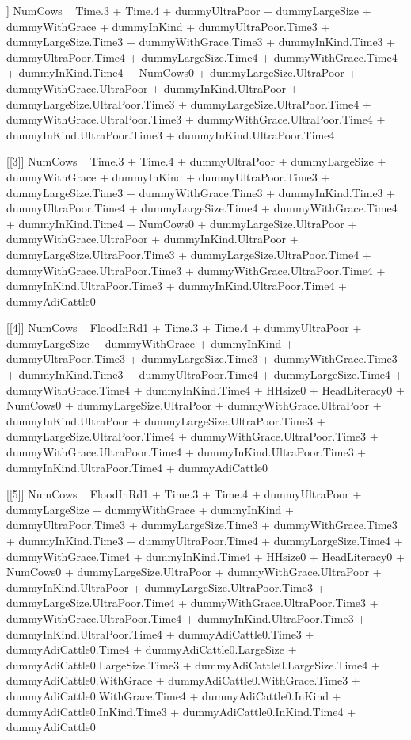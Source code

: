 \begin{Schunk}
\begin{Soutput}
[[2]]
NumCows ~ Time.3 + Time.4 + dummyUltraPoor + dummyLargeSize + 
    dummyWithGrace + dummyInKind + dummyUltraPoor.Time3 + dummyLargeSize.Time3 + 
    dummyWithGrace.Time3 + dummyInKind.Time3 + dummyUltraPoor.Time4 + 
    dummyLargeSize.Time4 + dummyWithGrace.Time4 + dummyInKind.Time4 + 
    NumCows0 + dummyLargeSize.UltraPoor + dummyWithGrace.UltraPoor + 
    dummyInKind.UltraPoor + dummyLargeSize.UltraPoor.Time3 + 
    dummyLargeSize.UltraPoor.Time4 + dummyWithGrace.UltraPoor.Time3 + 
    dummyWithGrace.UltraPoor.Time4 + dummyInKind.UltraPoor.Time3 + 
    dummyInKind.UltraPoor.Time4

[[3]]
NumCows ~ Time.3 + Time.4 + dummyUltraPoor + dummyLargeSize + 
    dummyWithGrace + dummyInKind + dummyUltraPoor.Time3 + dummyLargeSize.Time3 + 
    dummyWithGrace.Time3 + dummyInKind.Time3 + dummyUltraPoor.Time4 + 
    dummyLargeSize.Time4 + dummyWithGrace.Time4 + dummyInKind.Time4 + 
    NumCows0 + dummyLargeSize.UltraPoor + dummyWithGrace.UltraPoor + 
    dummyInKind.UltraPoor + dummyLargeSize.UltraPoor.Time3 + 
    dummyLargeSize.UltraPoor.Time4 + dummyWithGrace.UltraPoor.Time3 + 
    dummyWithGrace.UltraPoor.Time4 + dummyInKind.UltraPoor.Time3 + 
    dummyInKind.UltraPoor.Time4 + dummyAdiCattle0

[[4]]
NumCows ~ FloodInRd1 + Time.3 + Time.4 + dummyUltraPoor + dummyLargeSize + 
    dummyWithGrace + dummyInKind + dummyUltraPoor.Time3 + dummyLargeSize.Time3 + 
    dummyWithGrace.Time3 + dummyInKind.Time3 + dummyUltraPoor.Time4 + 
    dummyLargeSize.Time4 + dummyWithGrace.Time4 + dummyInKind.Time4 + 
    HHsize0 + HeadLiteracy0 + NumCows0 + dummyLargeSize.UltraPoor + 
    dummyWithGrace.UltraPoor + dummyInKind.UltraPoor + dummyLargeSize.UltraPoor.Time3 + 
    dummyLargeSize.UltraPoor.Time4 + dummyWithGrace.UltraPoor.Time3 + 
    dummyWithGrace.UltraPoor.Time4 + dummyInKind.UltraPoor.Time3 + 
    dummyInKind.UltraPoor.Time4 + dummyAdiCattle0

[[5]]
NumCows ~ FloodInRd1 + Time.3 + Time.4 + dummyUltraPoor + dummyLargeSize + 
    dummyWithGrace + dummyInKind + dummyUltraPoor.Time3 + dummyLargeSize.Time3 + 
    dummyWithGrace.Time3 + dummyInKind.Time3 + dummyUltraPoor.Time4 + 
    dummyLargeSize.Time4 + dummyWithGrace.Time4 + dummyInKind.Time4 + 
    HHsize0 + HeadLiteracy0 + NumCows0 + dummyLargeSize.UltraPoor + 
    dummyWithGrace.UltraPoor + dummyInKind.UltraPoor + dummyLargeSize.UltraPoor.Time3 + 
    dummyLargeSize.UltraPoor.Time4 + dummyWithGrace.UltraPoor.Time3 + 
    dummyWithGrace.UltraPoor.Time4 + dummyInKind.UltraPoor.Time3 + 
    dummyInKind.UltraPoor.Time4 + dummyAdiCattle0.Time3 + dummyAdiCattle0.Time4 + 
    dummyAdiCattle0.LargeSize + dummyAdiCattle0.LargeSize.Time3 + 
    dummyAdiCattle0.LargeSize.Time4 + dummyAdiCattle0.WithGrace + 
    dummyAdiCattle0.WithGrace.Time3 + dummyAdiCattle0.WithGrace.Time4 + 
    dummyAdiCattle0.InKind + dummyAdiCattle0.InKind.Time3 + dummyAdiCattle0.InKind.Time4 + 
    dummyAdiCattle0


\end{Soutput}
\end{Schunk}
